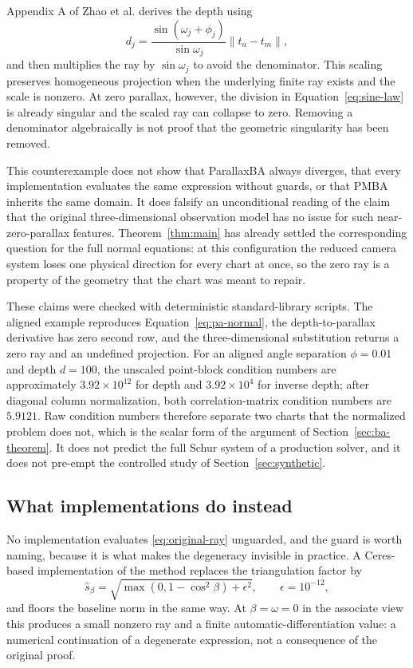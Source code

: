 \documentclass[11pt,a4paper]{article}
\theoremstyle{definition}
\theoremstyle{remark}
\begin{document}
Appendix A of Zhao et al. derives the depth using
\begin{equation}
  d_j=\frac{\sin(\omega_j+\phi_j)}{\sin\omega_j}\|t_a-t_m\|,
  \label{eq:sine-law}
\end{equation}
and then multiplies the ray by $\sin\omega_j$ to avoid the denominator. This scaling preserves homogeneous projection when the underlying finite ray exists and the scale is nonzero. At zero parallax, however, the division in Equation~\eqref{eq:sine-law} is already singular and the scaled ray can collapse to zero. Removing a denominator algebraically is not proof that the geometric singularity has been removed.

This counterexample does not show that ParallaxBA always diverges, that every implementation evaluates the same expression without guards, or that PMBA inherits the same domain. It does falsify an unconditional reading of the claim that the original three-dimensional observation model has no issue for such near-zero-parallax features. Theorem~\ref{thm:main} has already settled the corresponding question for the full normal equations: at this configuration the reduced camera system loses one physical direction for every chart at once, so the zero ray is a property of the geometry that the chart was meant to repair.

These claims were checked with deterministic standard-library scripts. The aligned example reproduces Equation~\eqref{eq:pa-normal}, the depth-to-parallax derivative has zero second row, and the three-dimensional substitution returns a zero ray and an undefined projection. For an aligned angle separation $\phi=0.01$ and depth $d=100$, the unscaled point-block condition numbers are approximately $3.92\times10^{12}$ for depth and $3.92\times10^{4}$ for inverse depth; after diagonal column normalization, both correlation-matrix condition numbers are $5.9121$. Raw condition numbers therefore separate two charts that the normalized problem does not, which is the scalar form of the argument of Section~\ref{sec:ba-theorem}. It does not predict the full Schur system of a production solver, and it does not pre-empt the controlled study of Section~\ref{sec:synthetic}.

\subsection{What implementations do instead}
\label{sec:cep}
No implementation evaluates \eqref{eq:original-ray} unguarded, and the guard is worth naming, because it is what makes the degeneracy invisible in practice. A Ceres-based implementation of the method replaces the triangulation factor by
\begin{equation}
  \widehat{s}_\beta=
  \sqrt{\max(0,1-\cos^2\beta)+\epsilon^2},\qquad \epsilon=10^{-12},
  \label{eq:cep-floor}
\end{equation}
and floors the baseline norm in the same way. At $\beta=\omega=0$ in the associate view this produces a small nonzero ray and a finite automatic-differentiation value: a numerical continuation of a degenerate expression, not a consequence of the original proof.
\end{document}
